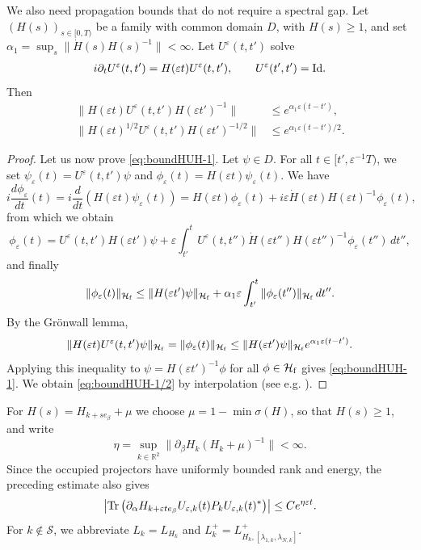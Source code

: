 \documentclass[a4paper,11pt]{article}
\theoremstyle{plain}
\theoremstyle{remark}
\def\R{{\mathbb R}}
\def\eps{{\varepsilon}}
\def\cH{{\mathcal H}}
\begin{document}
We also need propagation bounds that do not require a spectral gap.
Let $(H(s))_{s\in[0,T)}$ be a family with common domain $D$, with
$H(s)\ge1$, and set
$\alpha_1=\sup_s\|\dot H(s)H(s)^{-1}\|<\infty$.
Let $U^\eps(t,t')$ solve
\begin{align}\label{eq:Uepstt'}
i\partial_t U^\eps(t,t')=H(\eps t)U^\eps(t,t'),
\qquad U^\eps(t',t')={\rm Id}.
\end{align}
Then
\begin{align}
\|H(\eps t)U^\eps(t,t')H(\eps t')^{-1}\|
 &\le e^{\alpha_1\eps(t-t')},\label{eq:boundHUH-1}\\
\|H(\eps t)^{1/2}U^\eps(t,t')H(\eps t')^{-1/2}\|
 &\le e^{\alpha_1\eps(t-t')/2}.\label{eq:boundHUH-1/2}
\end{align}
\begin{proof}

Let us now prove \eqref{eq:boundHUH-1}. Let $\psi \in D$. For all $t \in [t',\eps^{-1}T)$, we set $\psi_\eps  (t) = U^\eps(t,t') \psi$ and $\phi_\eps(t)=H(\eps t) \psi_\eps(t)$. We have
$$
i \frac{d\phi_\eps}{dt} (t) = i \frac{d}{dt} \left( H(\eps t) \psi_\eps(t)  \right) =  H(\eps t) \phi_\eps(t) + i \eps \dot H(\eps t) H(\eps t)^{-1} \phi_\eps(t),
$$
from which we obtain
$$
\phi_\eps(t) = U^\eps(t,t') H(\eps t') \psi + \eps \int_{t'}^t U^\eps(t,t'')\dot H(\eps t'') H(\eps t'')^{-1} \phi_\eps(t'') \, dt'',
$$
and finally
$$
\|\phi_\eps(t)\|_{\cH_{\rm f}} \le \|H(\eps t') \psi\|_{\cH_{\rm f}} + \alpha_1 \eps \int_{t'}^t \|\phi_\eps(t'')\|_{\cH_{\rm f}} \, dt''.
$$
By the Gr\"onwall lemma,
$$
\| H(\eps t) U^\eps(t,t') \psi \|_{\cH_{\rm f}} =  \|\phi_\eps(t)\|_{\cH_{\rm f}} \le \|H(\eps t') \psi\|_{\cH_{\rm f}} e^{\alpha_1 \eps (t-t')}.
$$
Applying this inequality to $\psi=H(\eps t')^{-1}\phi$ for all $\phi
\in \cH_{\rm f}$ gives \eqref{eq:boundHUH-1}. We obtain \eqref{eq:boundHUH-1/2} by interpolation (see e.g. \cite[Section IX.4, Proposition 9]{ReedSimon2}).
\end{proof}


For $H(s)=H_{k+se_\beta}+\mu$ we choose
$\mu=1-\min\sigma(H)$, so that $H(s)\ge1$, and write
\[
\eta=\sup_{k\in\R^2}
\|\partial_\beta H_k(H_k+\mu)^{-1}\|<\infty.
\]
Since the occupied projectors have uniformly bounded rank and energy,
the preceding estimate also gives
\begin{equation}\label{eq:first_bound}
\left|\Tr\left(\partial_\alpha H_{k+\eps te_\beta}
U_{\eps,k}(t)P_k
U_{\eps,k}(t)^*\right)\right|
\le C e^{\eta\eps t}.
\end{equation}
For $k\notin\mathcal S$, we abbreviate $L_k=L_{H_k}$ and
$L_k^+=L_{H_k,[\lambda_{1,k},\lambda_{N,k}]}^+$.
\end{document}
